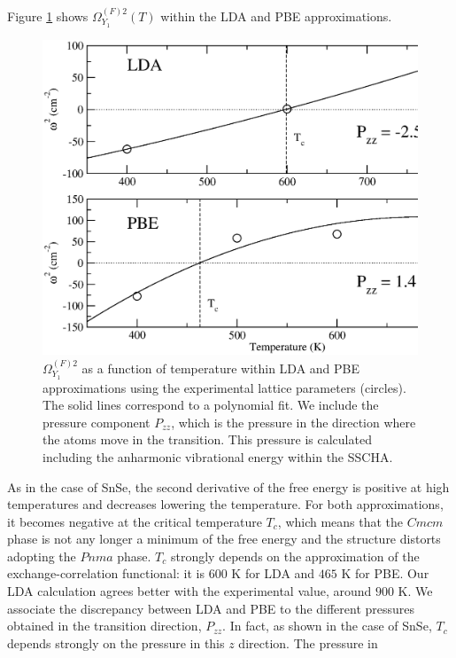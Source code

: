 Figure \ref{transition-sns} shows $\Omega^{(F)2}_{Y_{1}}(T)$ within the LDA and PBE approximations.
\begin{figure}[h]
\includegraphics[width=\linewidth]{Figures/freq-sns.eps}
	\caption[Phonon collapse in SnS.]{$\Omega^{(F)2}_{Y_{1}}$ as a function of temperature within LDA and PBE approximations using the experimental lattice parameters (circles). The solid lines correspond to a polynomial fit. We include the pressure component
$P_{zz}$, which is the pressure in the direction where the atoms move in the transition.  This pressure is calculated including the anharmonic vibrational energy within the SSCHA.}
\label{transition-sns}
\end{figure}
As in the case of SnSe\cite{aseginolaza2019phonon}, the second derivative of the free energy is positive at high temperatures and decreases lowering the temperature. For both approximations, it becomes negative at the critical
temperature $T_c$, which means that the $Cmcm$ phase is not any longer a minimum of the free energy and the structure distorts adopting the $Pnma$ phase. $T_{c}$ strongly depends on the approximation of the exchange-correlation
functional: it is $600$ K for LDA and $465$ K for PBE. Our LDA calculation agrees better with the experimental value, around $900$ K\cite{chattopadhyay1986neutron}. We associate the discrepancy between LDA and PBE  to the different
pressures obtained in the transition direction, $P_{zz}$. In fact, as shown in the case of SnSe\cite{aseginolaza2019phonon}, $T_{c}$ depends strongly on the pressure in this $z$ direction. The pressure in
